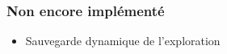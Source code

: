 \documentclass{article}
\numberwithin{figure}{section}
\numberwithin{table}{section}
\begin{document}
\subsubsection*{Non encore implémenté}
\begin{itemize}
    \item Sauvegarde dynamique de l'exploration
\end{itemize}




\newpage
{}

\footnotesize{}
\end{document}

